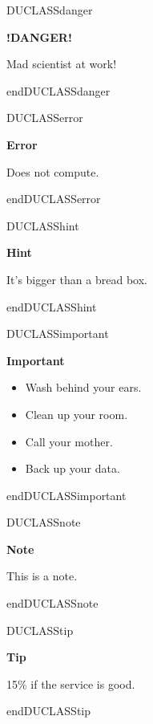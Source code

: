 \documentclass[a4paper]{article}
\newenvironment{DUclass}[1]%
    {%
     \def\DocutilsClassFunctionName{DUCLASS#1}
     \csname \DocutilsClassFunctionName \endcsname}%
    {\csname end\DocutilsClassFunctionName \endcsname}%
\newenvironment{DUadmonition}%
    {\begin{center}
       \begin{lrbox}{\DUadmonitionbox}
         \begin{minipage}{0.9\linewidth}
    }%
    {    \end{minipage}
       \end{lrbox}
       \fbox{\usebox{\DUadmonitionbox}}
     \end{center}
    }
\providecommand*{\DUtitle}[1]{%
  \smallskip\noindent\textbf{#1}\smallskip}
\begin{document}
\begin{DUclass}{danger}
\begin{DUadmonition}
\DUtitle{!DANGER!}

Mad scientist at work!
\end{DUadmonition}
\end{DUclass}

\begin{DUclass}{error}
\begin{DUadmonition}
\DUtitle{Error}

Does not compute.
\end{DUadmonition}
\end{DUclass}

\begin{DUclass}{hint}
\begin{DUadmonition}
\DUtitle{Hint}

It’s bigger than a bread box.
\end{DUadmonition}
\end{DUclass}

\begin{DUclass}{important}
\begin{DUadmonition}
\DUtitle{Important}

\begin{itemize}
\item Wash behind your ears.

\item Clean up your room.

\item Call your mother.

\item Back up your data.
\end{itemize}
\end{DUadmonition}
\end{DUclass}

\begin{DUclass}{note}
\begin{DUadmonition}
\DUtitle{Note}

This is a note.
\end{DUadmonition}
\end{DUclass}

\begin{DUclass}{tip}
\begin{DUadmonition}
\DUtitle{Tip}

15\% if the service is good.
\end{DUadmonition}
\end{DUclass}
\end{document}
